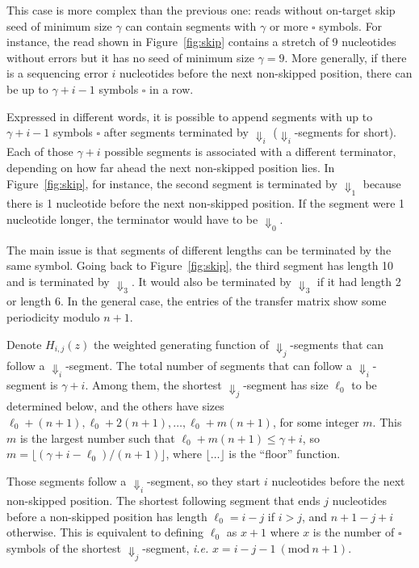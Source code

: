 \documentclass{article}
\newcommand{\modulo}[1]{\ (\mathrm{mod}\ #1)}
\begin{document}
This case is more complex than the previous one: reads without on-target
skip seed of minimum size $\gamma$ can contain segments with $\gamma$ or
more $\square$ symbols. For instance, the read shown in
Figure~\ref{fig:skip} contains a stretch of 9 nucleotides without errors
but it has no seed of minimum size $\gamma=9$. More generally, if there is
a sequencing error $i$ nucleotides before the next non-skipped position,
there can be up to $\gamma+i-1$ symbols $\square$ in a row.

Expressed in different words, it is possible to append segments with up to
$\gamma+i-1$ symbols $\square$ after segments terminated by $\Downarrow_i$
($\Downarrow_i$-segments for short). Each of those $\gamma+i$ possible
segments is associated with a different terminator, depending on how far
ahead the next non-skipped position lies. In Figure~\ref{fig:skip}, for
instance, the second segment is terminated by $\Downarrow_1$ because there
is 1 nucleotide before the next non-skipped position. If the segment were
1 nucleotide longer, the terminator would have to be $\Downarrow_0$.

The main issue is that segments of different lengths can be terminated by
the same symbol. Going back to Figure~\ref{fig:skip}, the third segment
has length 10 and is terminated by $\Downarrow_3$. It would also be
terminated by $\Downarrow_3$ if it had length 2 or length 6. In the
general case, the entries of the transfer matrix show some periodicity
modulo $n+1$.

Denote $H_{i,j}(z)$ the weighted generating function of
$\Downarrow_j$-segments that can follow a $\Downarrow_i$-segment. The
total number of segments that can follow a $\Downarrow_i$-segment is
$\gamma+i$. Among them, the shortest $\Downarrow_j$-segment has size
$\ell_0$ to be determined below, and the others have sizes $\ell_0+(n+1),
\ell_0+2(n+1), \ldots, \ell_0+m(n+1)$, for some integer $m$. This $m$ is
the largest number such that $\ell_0+m(n+1) \leq \gamma+i$, so $m =
\lfloor (\gamma+i-\ell_0)/(n+1)\rfloor$, where $\lfloor \ldots \rfloor$ is
the ``floor'' function.

Those segments follow a $\Downarrow_i$-segment, so they start $i$
nucleotides before the next non-skipped position. The shortest following
segment that ends $j$ nucleotides before a non-skipped position has length
$\ell_0 = i-j$ if $i > j$, and $n+1-j+i$ otherwise. This is equivalent to
defining $\ell_0$ as $x+1$ where $x$ is the number of $\square$ symbols of
the shortest $\Downarrow_j$-segment, \textit{i.e.} $x = i-j-1
\modulo{n+1}$.
\end{document}
